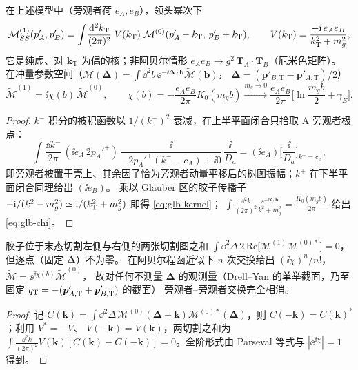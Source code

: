 \begin{proposition}\label{prop:glb-kernel}
在上述模型中（旁观者荷 $e_A,e_B$），领头幂次下
\begin{equation}\label{eq:glb-kernel}
\mathcal M^{(1)}_{SS}(p_A',p_B')=\int\!\frac{\mathrm{d}^2k_{\mathrm T}}{(2\pi)^2}\;V(k_{\mathrm{T}})\;\mathcal M^{(0)}(p_A'-k_{\mathrm T},\,p_B'+k_{\mathrm T}),
\qquad V(k_{\mathrm{T}})=\frac{-\mathrm{i}\,e_Ae_B}{k_{\mathrm{T}}^2+m_g^2},
\end{equation}
它是纯虚、对 $\bm k_{\mathrm T}$ 为偶的核；非阿贝尔情形 $e_Ae_B\to g^2\,\bm T_A\!\cdot\!\bm T_B$（厄米色矩阵）。
在冲量参数空间（$\mathcal M(\bm\Delta)=\int\dd^2b\,\ee^{-\ii\bm\Delta\cdot\bm b}\tilde{\mathcal M}(\bm b)$，
$\bm\Delta=(\bm p'_{B,\mathrm T}-\bm p'_{A,\mathrm T})/2$）
\begin{equation}\label{eq:glb-chi}
\tilde{\mathcal M}^{(1)}=\ii\chi(b)\,\tilde{\mathcal M}^{(0)},\qquad
\chi(b)=-\frac{e_Ae_B}{2\pi}K_0(m_gb)\xrightarrow{m_g\to0}\frac{e_Ae_B}{2\pi}\Big[\ln\frac{m_gb}{2}+\gamma_E\Big].
\end{equation}
\end{proposition}
\begin{proof}
$k^-$ 积分的被积函数以 $1/(k^-)^2$ 衰减，在上半平面闭合只拾取 A 旁观者极点：
\[
\int\!\frac{\dd k^-}{2\pi}\,(\ii e_A\,2p_A'^+)\,\frac{\ii}{-2p_A'^+(k^--c_A)+\ii0}\,\frac{\ii}{D_a}=(\ii e_A)\Big[\frac{\ii}{D_a}\Big]_{k^-=c_A},
\]
即旁观者被置于壳上、其余因子恰为旁观者动量平移后的树图振幅；$k^+$ 在下半平面闭合同理给出 $(\ii e_B)$。
乘以 Glauber 区的胶子传播子 $-\mathrm{i}/(k^2-m_g^2)\simeq \mathrm{i}/(k_{\mathrm{T}}^2+m_g^2)$ 即得 \eqref{eq:glb-kernel}；
$\int\frac{\dd^2k}{(2\pi)^2}\frac{\ee^{-\ii\bm k\cdot\bm b}}{k^2+m_g^2}=\frac{K_0(m_gb)}{2\pi}$ 给出 \eqref{eq:glb-chi}。
\end{proof}

\begin{proposition}\label{prop:glb-cancel}
胶子位于末态切割左侧与右侧的两张切割图之和
$\int\dd^2\Delta\,2\,\mathrm{Re}\big[\mathcal M^{(1)}\mathcal M^{(0)*}\big]=0$，但逐点（固定 $\bm\Delta$）不为零。
在阿贝尔程函近似下 $n$ 次交换给出 $(\ii\chi)^n/n!$，$\tilde{\mathcal M}=\ee^{\ii\chi(b)}\tilde{\mathcal M}^{(0)}$，
故对任何不测量 $\bm\Delta$ 的观测量（Drell--Yan 的单举截面，乃至固定 $q_{\mathrm{T}}=-(\bm p'_{A,\mathrm T}+\bm p'_{B,\mathrm T})$ 的截面）
旁观者–旁观者交换完全相消。
\end{proposition}
\begin{proof}
记 $C(\bm k)=\int\dd^2\Delta\,\mathcal M^{(0)}(\bm\Delta+\bm k)\mathcal M^{(0)*}(\bm\Delta)$，则 $C(-\bm k)=C(\bm k)^*$；利用 $V^*=-V$、
$V(-\bm k)=V(\bm k)$，两切割之和为 $\int\frac{\dd^2k}{(2\pi)^2}V(\bm k)[C(\bm k)-C(-\bm k)]=0$。全阶形式由 Parseval 等式与 $|\ee^{\ii\chi}|=1$ 得到。
\end{proof}

